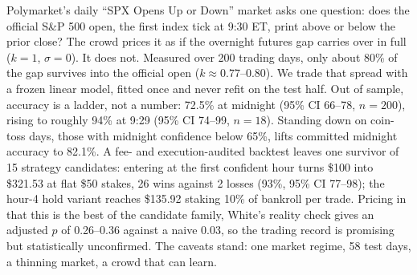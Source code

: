 Polymarket's daily ``SPX Opens Up or Down'' market asks one question: does the
official S\&P 500 open, the first index tick at 9:30 ET, print above or
below the prior close? The crowd prices it as if the overnight futures gap
carries over in full ($k=1$, $\sigma=0$). It does not. Measured over 200
trading days, only about 80\% of the gap survives into the official open
($k \approx 0.77$--$0.80$). We trade that spread with a frozen linear model,
fitted once and never refit on the test half. Out of sample, accuracy is a
ladder, not a number: 72.5\% at midnight (95\% CI 66--78, $n=200$), rising to
roughly 94\% at 9:29 (95\% CI 74--99, $n=18$).
Standing down on coin-toss days, those with midnight confidence below 65\%,
lifts committed midnight accuracy to 82.1\%. A fee- and execution-audited
backtest leaves one survivor of 15 strategy candidates: entering at the first
confident hour turns \$100 into \$321.53 at flat \$50 stakes, 26 wins against
2 losses (93\%, 95\% CI 77--98); the hour-4 hold variant reaches \$135.92
staking 10\% of bankroll per trade. Pricing in that this is the best of the
candidate family, White's reality check gives an adjusted $p$ of 0.26--0.36
against a naive 0.03, so the trading record is promising but statistically
unconfirmed. The caveats stand: one market regime, 58 test days, a thinning
market, a crowd that can learn.
